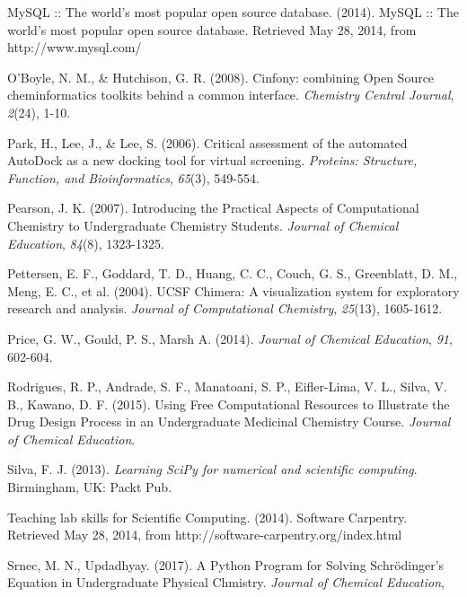 \documentclass[10pt,letterpaper]{article}
\begin{document}
\begin{thebibliography}{99}
 MySQL :: The world's most popular open source database. (2014).
 MySQL :: The world's most popular open source database.
 Retrieved May 28, 2014, from {\footnotesize http://www.mysql.com/}

 O'Boyle, N. M., \& Hutchison, G. R. (2008).
 Cinfony: combining Open Source cheminformatics toolkits behind a common interface.
 \textit{Chemistry Central Journal},
 \textit{2}(24),
 1-10.

 Park, H., Lee, J., \& Lee, S. (2006).
 Critical assessment of the automated AutoDock as a new docking tool for virtual screening.
 \textit{Proteins: Structure, Function, and Bioinformatics},
 \textit{65}(3),
 549-554.

 Pearson, J. K. (2007).
 Introducing the Practical Aspects of Computational Chemistry to Undergraduate Chemistry Students.
 \textit{Journal of Chemical Education},
 \textit{84}(8),
 1323-1325.

 Pettersen, E. F., Goddard, T. D., Huang, C. C., Couch, G. S., Greenblatt, D. M., Meng, E. C., et al. (2004).
 UCSF Chimera: A visualization system for exploratory research and analysis.
 \textit{Journal of Computational Chemistry},
 \textit{25}(13),
 1605-1612.

 Price, G. W., Gould, P. S., Marsh A. (2014).
 \textit{Journal of Chemical Education},
 \textit{91},
 602-604.
 
 Rodrigues, R. P., Andrade, S. F., Manatoani, S. P., Eifler-Lima, V. L., Silva, V. B., Kawano, D. F. (2015).
 Using Free Computational Resources to Illustrate the Drug Design Process in an Undergraduate Medicinal Chemistry Course.
 \textit{Journal of Chemical Education}.

 Silva, F. J. (2013).
 \textit{Learning SciPy for numerical and scientific computing}.
 Birmingham, UK:
 Packt Pub.

 Teaching lab skills for Scientific Computing. (2014).
 Software Carpentry.
 Retrieved May 28, 2014, from {\footnotesize http://software-carpentry.org/index.html}

 Srnec, M. N., Updadhyay. (2017).
 A Python Program for Solving Schr\"odinger's Equation in Undergraduate Physical Chmistry.
 \textit{Journal of Chemical Education},


\end{thebibliography}
\end{document}

